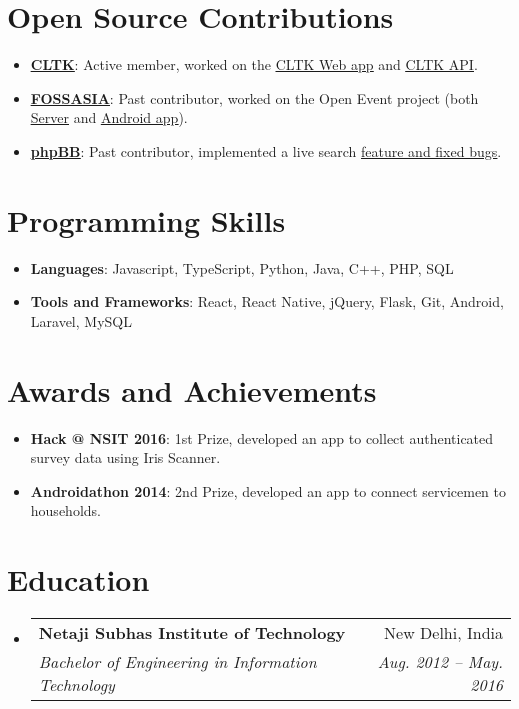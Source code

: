 \documentclass[letterpaper,11pt]{article}
\makeatletter
\newcommand{\resumeItem}[2]{
  \item\small{
    \textbf{#1}{: #2 \vspace{-2pt}}
  }
}
\newcommand{\resumeSubheading}[4]{
  \vspace{-1pt}\item
    \begin{tabular*}{0.97\textwidth}{l@{\extracolsep{\fill}}r}
      \textbf{#1} & #2 \\
      \textit{\small#3} & \textit{\small #4} \\
    \end{tabular*}\vspace{-5pt}
}
\newcommand{\resumeSubItem}[2]{\resumeItem{#1}{#2}\vspace{-4pt}}
\newcommand{\resumeSubHeadingListStart}{\begin{itemize}[leftmargin=*]}
\newcommand{\resumeSubHeadingListEnd}{\end{itemize}}
\makeatother
\begin{document}
\section{Open Source Contributions}
  \resumeSubHeadingListStart
    \resumeSubItem{\href{https://github.com/cltk}{\underline{CLTK}}}
      {Active member, worked on the \href{https://github.com/cltk/cltk_frontend/commits?author=suheb}{\underline{CLTK Web app}} and \href{https://github.com/cltk/cltk_api/commits?author=suheb}{\underline{CLTK API}}.}
    \resumeSubItem{\href{https://github.com/fossasia}{\underline{FOSSASIA}}}
      {Past contributor, worked on the Open Event project (both \href{https://github.com/fossasia/open-event-server/pulls?q=is\%3Apr+author\%3Asuheb+is\%3Aclosed}{\underline{Server}} and \href{https://github.com/fossasia/open-event-droidgen/pulls?q=is\%3Apr+is\%3Aclosed+author\%3Asuheb}{\underline{Android app}}).}
    \resumeSubItem{\href{https://github.com/phpbb}{\underline{phpBB}}}
      {Past contributor, implemented a live search \href{https://github.com/phpbb/phpbb/pulls?q=is\%3Apr+author\%3Asuheb+is\%3Aclosed}{\underline{feature and fixed bugs}}.}
  \resumeSubHeadingListEnd
  
\section{Programming Skills}
 \resumeSubHeadingListStart
    \resumeSubItem{Languages}
       {Javascript, TypeScript, Python, Java, C++, PHP, SQL}
    \resumeSubItem{Tools and Frameworks}
       {React, React Native, jQuery, Flask, Git, Android, Laravel, MySQL}
 \resumeSubHeadingListEnd

\section{Awards and Achievements}
  \resumeSubHeadingListStart
    \resumeSubItem{Hack @ NSIT 2016}
       {1st Prize, developed an app to collect authenticated survey data using Iris Scanner.}
    \resumeSubItem{Androidathon 2014}
       {2nd Prize, developed an app to connect servicemen to households.}
  \resumeSubHeadingListEnd


\section{Education}
  \resumeSubHeadingListStart
    \resumeSubheading
      {Netaji Subhas Institute of Technology}{New Delhi, India}
      {Bachelor of Engineering in Information Technology}{Aug. 2012 -- May. 2016}
  \resumeSubHeadingListEnd
\end{document}
